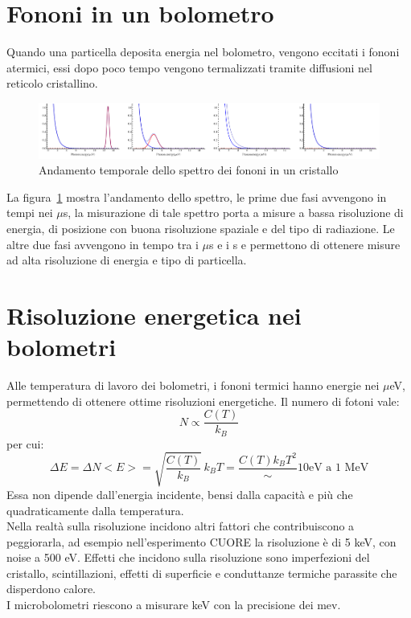 \section{Fononi in un bolometro}
Quando una particella deposita energia nel bolometro, vengono eccitati i fononi atermici, essi dopo poco tempo vengono termalizzati tramite diffusioni
nel reticolo cristallino.
\begin{figure}[htbp]
\begin{center}
\includegraphics[scale=0.45]{./Immagini/SpettroFononi.png}
\caption{Andamento temporale dello spettro dei fononi in un cristallo}
\label{fig:spettroFononi}
\end{center}
\end{figure}
La figura~\ref{fig:spettroFononi} mostra l'andamento dello spettro, le prime due fasi avvengono in tempi nei $\mu$s, la misurazione di tale spettro
porta a misure a bassa risoluzione di energia, di posizione con buona risoluzione spaziale e del tipo di radiazione.
Le altre due fasi avvengono in tempo tra i $\mu$s e i s e permettono di ottenere misure ad alta risoluzione di energia e tipo di particella.
\section{Risoluzione energetica nei bolometri}
Alle temperatura di lavoro dei bolometri, i fononi termici hanno energie nei $\mu$eV, permettendo di ottenere ottime risoluzioni energetiche.
Il numero di fotoni vale:
\begin{equation*}
N \propto \frac{C(T)}{k_B}
\end{equation*}
per cui:
\begin{equation*}
\Delta E = \Delta N <E>  = \sqrt{\frac{C(T)}{k_B}}\, k_B T = \frac{C(T) k_B T^2} \sim 10 \text{eV a 1 MeV}
\end{equation*}
Essa non dipende dall'energia incidente, bensi dalla capacit\`a e pi\`u che quadraticamente dalla temperatura.\\
Nella realt\`a sulla risoluzione incidono altri fattori che contribuiscono a peggiorarla, ad esempio nell'esperimento CUORE la risoluzione \`e
di 5 keV, con noise a 500 eV.
Effetti che incidono sulla risoluzione sono imperfezioni del cristallo, scintillazioni, effetti di superficie e conduttanze termiche parassite che disperdono calore.\\
I microbolometri riescono a misurare keV con la precisione dei mev.
